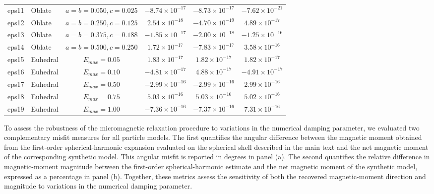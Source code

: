 \documentclass[11pt,a4paper]{article}
\begin{document}
\begin{table}[!htbp]
\begin{tabular}{llcccc}
eps11 & Oblate & $a = b = 0.050, c = 0.025$ &
$-8.74 \times 10^{-17}$ &
$-8.73 \times 10^{-17}$ &
$-7.62 \times 10^{-21}$ \\

eps12 & Oblate & $a = b = 0.250, c = 0.125$ &
$2.54 \times 10^{-18}$ &
$-4.70 \times 10^{-19}$ &
$4.89 \times 10^{-17}$ \\

eps13 & Oblate & $a = b = 0.375, c = 0.188$ &
$-1.85 \times 10^{-17}$ &
$-2.00 \times 10^{-18}$ &
$-1.25 \times 10^{-16}$ \\

eps14 & Oblate & $a = b = 0.500, c = 0.250$ &
$1.72 \times 10^{-17}$ &
$-7.83 \times 10^{-17}$ &
$3.58 \times 10^{-16}$ \\

\midrule

eps15 & Euhedral & $E_{max} = 0.05$ &
$1.83 \times 10^{-17}$ &
$1.82 \times 10^{-17}$ &
$1.82 \times 10^{-17}$ \\

eps16 & Euhedral & $E_{max} = 0.10$ &
$-4.81 \times 10^{-17}$ &
$4.88 \times 10^{-17}$ &
$-4.91 \times 10^{-17}$ \\

eps17 & Euhedral & $E_{max} = 0.50$ &
$-2.99 \times 10^{-16}$ &
$-2.99 \times 10^{-16}$ &
$2.99 \times 10^{-16}$ \\

eps18 & Euhedral & $E_{max} = 0.75$ &
$5.03 \times 10^{-16}$ &
$5.03 \times 10^{-16}$ &
$5.02 \times 10^{-16}$ \\

eps19 & Euhedral & $E_{max} = 1.00$ &
$-7.36 \times 10^{-16}$ &
$-7.37 \times 10^{-16}$ &
$7.31 \times 10^{-16}$ \\

\bottomrule
\end{tabular}
\end{table}

\clearpage

To assess the robustness of the micromagnetic relaxation procedure to variations in the numerical damping parameter, we evaluated two complementary misfit measures for all particle models. The first quantifies the angular difference between the magnetic moment obtained from the first-order spherical-harmonic expansion evaluated on the spherical shell described in the main text and the net magnetic moment of the corresponding synthetic model. This angular misfit is reported in degrees in panel (a). The second quantifies the relative difference in magnetic-moment magnitude between the first-order spherical-harmonic estimate and the net magnetic moment of the synthetic model, expressed as a percentage in panel (b). Together, these metrics assess the sensitivity of both the recovered magnetic-moment direction and magnitude to variations in the numerical damping parameter.
\end{document}
